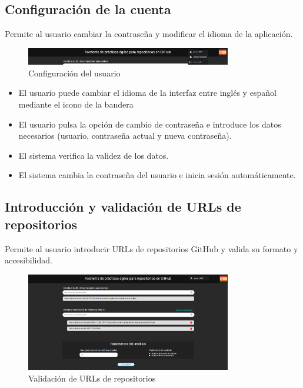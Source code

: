 \newpage
\subsection{Configuración de la cuenta}

Permite al usuario cambiar la contraseña y modificar el idioma de la aplicación.

\begin{figure}[H]
\centering
\includegraphics[width=0.8\textwidth]{img/E3-user-configuration.png}
\caption{Configuración del usuario}
\label{fig:E3-user-configuration}
\end{figure}

\begin{itemize}
    \item El usuario puede cambiar el idioma de la interfaz entre inglés y español mediante el icono de la bandera
    \item El usuario pulsa la opción de cambio de contraseña e introduce los datos necesarios (usuario, contraseña actual y nueva contraseña).
    \item El sistema verifica la validez de los datos.
    \item El sistema cambia la contraseña del usuario e inicia sesión automáticamente.
\end{itemize}

\newpage
\subsection{Introducción y validación de URLs de repositorios}

Permite al usuario introducir URLs de repositorios GitHub y valida su formato y accesibilidad.

\begin{figure}[H]
\centering
\includegraphics[width=0.8\textwidth]{img/E4-urls.png}
\caption{Validación de URLs de repositorios}
\label{fig:E4-urls}
\end{figure}

